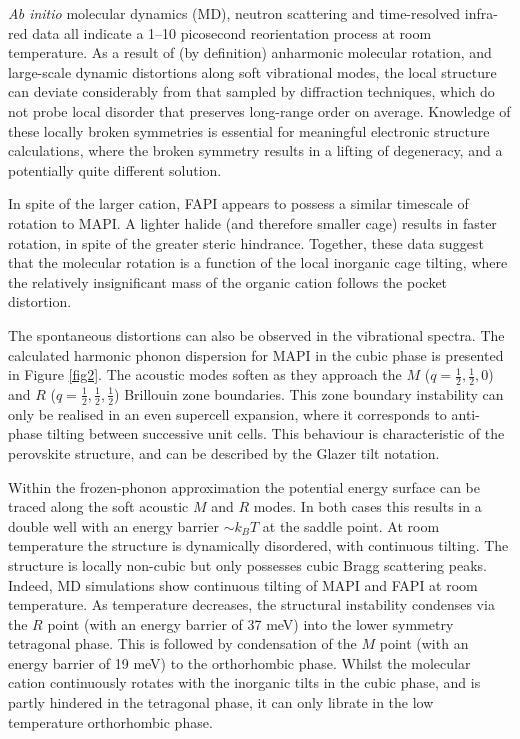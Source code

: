 \emph{Ab initio} molecular dynamics (MD), neutron scattering\autocite{Leguy2015b,Chen2015s} and time-resolved infra-red\autocite{Bakulin2015a} data all indicate a 1--10 picosecond reorientation process at room temperature.
As a result of (by definition) anharmonic molecular rotation, and large-scale dynamic distortions along soft 
vibrational modes, the local structure can deviate considerably from that sampled by diffraction techniques, which do not probe local disorder that preserves long-range order on average.
Knowledge of these locally broken symmetries is essential for meaningful electronic structure calculations, where the broken symmetry results in a lifting of degeneracy, and a potentially quite different solution. 

In spite of the larger cation, FAPI appears to possess a similar timescale of rotation to MAPI\autocite{Weller2015b}. 
A lighter halide (and therefore smaller cage) results in faster rotation, in spite of the greater steric hindrance.\autocite{selig2017organic}
Together, these data suggest that the molecular rotation is a function of the local inorganic cage tilting, where the relatively insignificant mass of the organic cation follows the pocket distortion. 

The spontaneous distortions can also be observed in the vibrational spectra.
The calculated harmonic phonon dispersion for MAPI in the cubic phase is presented in Figure \ref{fig2}.
The acoustic modes soften as they approach the $M$ ($q = \frac{1}{2}, \frac{1}{2}, 0$) and $R$ ($q = \frac{1}{2}, \frac{1}{2}, \frac{1}{2}$) Brillouin zone boundaries. 
This zone boundary instability can only be realised in an even supercell expansion, where it corresponds to anti-phase tilting between successive unit cells.
This behaviour is characteristic of the perovskite structure, and can be described by the Glazer tilt notation.\autocite{Glazer1972,Woodward1997} 

Within the frozen-phonon approximation the potential energy surface can be traced along the soft acoustic $M$ and $R$ modes. 
In both cases this results in a double well with an energy barrier $\sim k_BT$ at the saddle point.\autocite{Whalley2016}  
At room temperature the structure is dynamically disordered, with continuous tilting.
The structure is locally non-cubic but only possesses cubic Bragg scattering peaks.\autocite{Beecher2016}
Indeed, MD simulations show continuous tilting of MAPI and FAPI at room temperature.\autocite{Frost2014,Quarti2015a,Weller2015b}
%
As temperature decreases, the structural instability condenses via the $R$ point (with an energy barrier of 37 meV) into the lower symmetry tetragonal phase. 
This is followed by condensation of the $M$ point (with an energy barrier of 19 meV) to the orthorhombic phase.\autocite{Whalley2016}
Whilst the molecular cation continuously rotates with the inorganic tilts in the cubic phase, and is partly hindered in the tetragonal phase, it can only librate in the low temperature orthorhombic phase.

